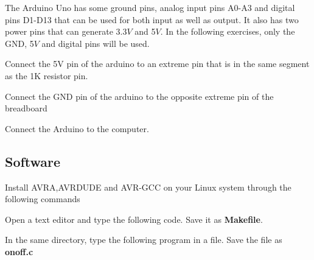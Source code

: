 \documentclass[journal,12pt,twocolumn]{IEEEtran}
\begin{document}
The Arduino Uno has some ground pins, analog input pins A0-A3 and digital pins D1-D13 that can be used for both input as well as output. It also has two power pins that can generate 3.3$V$ and 5$V$.  In the following exercises, only the GND, 5$V$ and digital pins will be used.
%
%
\begin{problem}
	Connect the 5V pin of the arduino to an  extreme pin that is in the same segment as the 1K resistor pin. 
	\end{problem}	
\begin{problem}
	Connect the GND pin of the arduino to the opposite extreme pin of the breadboard
\end{problem}
\begin{problem}
	Connect the Arduino to the computer.
\end{problem}

\subsection{Software}
\begin{problem}
Install AVRA,AVRDUDE and AVR-GCC on your Linux system through the following commands

\end{problem}
%
\begin{problem}
Open a text editor and type the following code.  Save it as \textbf{Makefile}.
\end{problem}

%
\begin{problem}
In the same directory, 
type the following program in a file.  Save the file as \textbf{onoff.c}
\end{problem}

%
\end{document}
